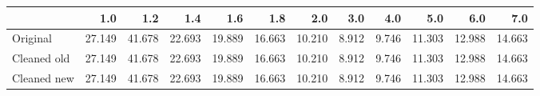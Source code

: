 \begin{tabular}{lrrrrrrrrrrr}
\toprule
{} &    1.0 &    1.2 &    1.4 &    1.6 &    1.8 &    2.0 &   3.0 &   4.0 &    5.0 &    6.0 &    7.0 \\
\midrule
Original    & 27.149 & 41.678 & 22.693 & 19.889 & 16.663 & 10.210 & 8.912 & 9.746 & 11.303 & 12.988 & 14.663 \\
Cleaned old & 27.149 & 41.678 & 22.693 & 19.889 & 16.663 & 10.210 & 8.912 & 9.746 & 11.303 & 12.988 & 14.663 \\
Cleaned new & 27.149 & 41.678 & 22.693 & 19.889 & 16.663 & 10.210 & 8.912 & 9.746 & 11.303 & 12.988 & 14.663 \\
\bottomrule
\end{tabular}
